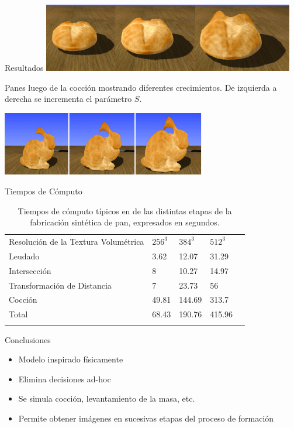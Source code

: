 \documentclass[spanish]{beamer}
\begin{document}
\begin{frame}{Resultados}
\includegraphics[width=11cm]{../figures/Fig14}

Panes luego de la cocción mostrando diferentes crecimientos. De izquierda a derecha se incrementa el parámetro $S$.

\includegraphics[width=9cm]{../figures/Fig15}


\end{frame}

\begin{frame}{Tiempos de Cómputo}

\begin{table}[h!]
\begin{tabular}{lllll}
\hline\noalign{\smallskip}
Resolución de la Textura Volumétrica & $256^{3}$ & $384^{3}$  & $512^{3}$ \\
\noalign{\smallskip}\hline\noalign{\smallskip}
Leudado & 3.62 & 12.07 & 31.29 \\
Intersección & 8 & 10.27 & 14.97 \\
Transformación de Distancia & 7 & 23.73 & 56 \\
Cocción  & 49.81 & 144.69 & 313.7 \\
\hline\noalign{\smallskip}
Total & 68.43 & 190.76 & 415.96 \\
\noalign{\smallskip}\hline
\end{tabular}
\caption{Tiempos de cómputo típicos en de las distintas etapas de la fabricación sintética de pan, expresados en segundos.}
\label{tab:computingtimes}
\end{table}
\end{frame}

\begin{frame}{Conclusiones}
\begin{block}{}
\begin{itemize}
\item Modelo inspirado físicamente
\item Elimina decisiones ad-hoc
\item Se simula cocción, levantamiento de la masa, etc.
\item Permite obtener imágenes en sucesivas etapas del proceso de formación
\end{itemize}
\end{block}
\end{frame}
\end{document}
